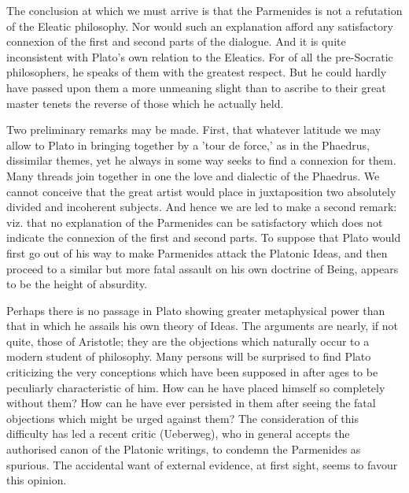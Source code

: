\documentclass[11pt,letter]{article}
\begin{document}
\par  The conclusion at which we must arrive is that the Parmenides is not a refutation of the Eleatic philosophy. Nor would such an explanation afford any satisfactory connexion of the first and second parts of the dialogue. And it is quite inconsistent with Plato's own relation to the Eleatics. For of all the pre-Socratic philosophers, he speaks of them with the greatest respect. But he could hardly have passed upon them a more unmeaning slight than to ascribe to their great master tenets the reverse of those which he actually held.

\par  Two preliminary remarks may be made. First, that whatever latitude we may allow to Plato in bringing together by a 'tour de force,' as in the Phaedrus, dissimilar themes, yet he always in some way seeks to find a connexion for them. Many threads join together in one the love and dialectic of the Phaedrus. We cannot conceive that the great artist would place in juxtaposition two absolutely divided and incoherent subjects. And hence we are led to make a second remark: viz. that no explanation of the Parmenides can be satisfactory which does not indicate the connexion of the first and second parts. To suppose that Plato would first go out of his way to make Parmenides attack the Platonic Ideas, and then proceed to a similar but more fatal assault on his own doctrine of Being, appears to be the height of absurdity.

\par  Perhaps there is no passage in Plato showing greater metaphysical power than that in which he assails his own theory of Ideas. The arguments are nearly, if not quite, those of Aristotle; they are the objections which naturally occur to a modern student of philosophy. Many persons will be surprised to find Plato criticizing the very conceptions which have been supposed in after ages to be peculiarly characteristic of him. How can he have placed himself so completely without them? How can he have ever persisted in them after seeing the fatal objections which might be urged against them? The consideration of this difficulty has led a recent critic (Ueberweg), who in general accepts the authorised canon of the Platonic writings, to condemn the Parmenides as spurious. The accidental want of external evidence, at first sight, seems to favour this opinion.
\end{document}
